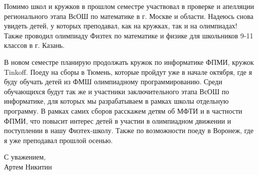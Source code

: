 \quad Помимо школ и кружков в прошлом семестре участвовал в проверке и апелляции регионального этапа ВсОШ по математике в г. Москве и области.
Надеюсь снова увидеть детей, у которых преподавал, как на кружках, так и на олимпиадах! Также проводил олимпиаду Физтех по математике и физике
для школьников 9-11 классов в г. Казань.

\quad В новом семестре планирую продолжать кружок по информатике ФПМИ, кружок Tinkoff. Поеду на сборы в Тюмень, которые пройдут уже в начале
октября, где я буду обучать детей из ФМШ олимпиадному программированию. Среди обучающихся будут так же и участники заключительного этапа ВсОШ
по информатике, для которых мы разрабатываем в рамках школы отдельную программу. В рамках самих сборов расскажем детям об МФТИ и в частности
ФПМИ, что повысит интерес детей в участии в олимпиадном движении и поступлении в нашу Физтех-школу. Также по возможности поеду в Воронеж, где
я уже преподавал прошлой осенью.

\begin{flushright}
    С уважением, \\
    Артем Никитин
\end{flushright}
